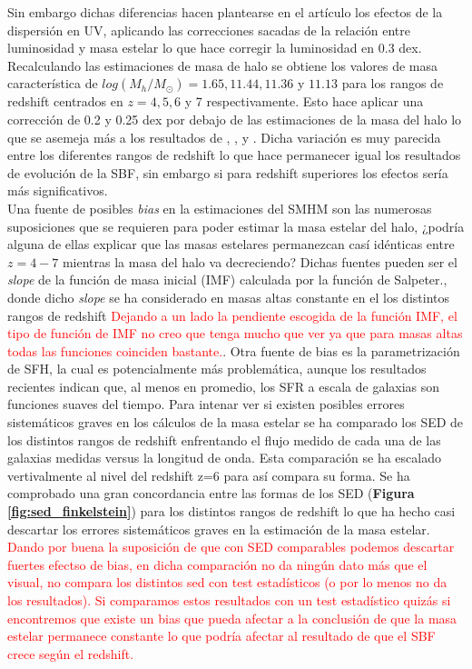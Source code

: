 Sin embargo dichas diferencias hacen plantearse en el artículo los efectos de la dispersión en UV, aplicando las correcciones sacadas de la relación entre luminosidad y masa estelar lo que hace corregir la luminosidad en 0.3 dex. Recalculando las estimaciones de masa de halo se obtiene los valores de masa característica de $log(M_h/M_\odot)=1.65, 11.44, 11.36$ y $11.13$ para los rangos de redshift centrados en $z=4,5,6$ y 7 respectivamente. Esto hace aplicar una corrección de 0.2 y 0.25 dex por debajo de las estimaciones de la masa del halo lo que se asemeja más a los resultados de \cite{behroozi2013average}, \cite{barone2014measurement}, \cite{lee2006large} y \cite{overzier2006clustering}. Dicha variación es muy parecida entre los diferentes rangos de redshift lo que hace permanecer igual los resultados de evolución de la SBF, sin embargo si para redshift superiores los efectos sería más significativos.\\

Una fuente de posibles \textit{bias} en la estimaciones del SMHM son las numerosas suposiciones que se requieren para poder estimar la masa estelar del halo, ¿podría alguna de ellas explicar que las masas estelares permanezcan casí idénticas entre $z=4-7$ mientras la masa del halo va decreciendo? Dichas fuentes pueden ser el \textit{slope} de la función de masa inicial (IMF) calculada por la función de Salpeter., donde dicho \textit{slope} se ha considerado en masas altas constante en el los distintos rangos de redshift \textcolor{red}{Dejando a un lado la pendiente escogida de la función IMF, el tipo de función de IMF no creo que tenga mucho que ver ya que para masas altas todas las funciones coinciden bastante.}. Otra fuente de bias es la parametrización de SFH, la cual es potencialmente más problemática, aunque los resultados recientes indican que, al menos en promedio, los SFR a escala de galaxias son funciones suaves del tiempo. Para intenar ver si existen posibles errores sistemáticos graves en los cálculos de la masa estelar se ha comparado  los SED de los distintos rangos de redshift enfrentando el flujo medido de cada una de las galaxias medidas versus la longitud de onda. Esta comparación se ha escalado vertivalmente al nivel del redshift z=6 para así compara su forma. Se ha comprobado una gran concordancia entre las formas de los SED (\textbf{Figura \ref{fig:sed_finkelstein}}) para los distintos rangos de redshift lo que ha hecho casi descartar los errores sistemáticos graves en la estimación de la masa estelar. \textcolor{red}{Dando por buena la suposición de que con SED comparables podemos descartar fuertes efectso de bias, en dicha comparación no da ningún dato más que el visual, no compara los distintos sed con test estadísticos (o por lo menos no da los resultados). Si comparamos estos resultados con un test estadístico quizás si encontremos que existe un bias que pueda afectar a la conclusión de que la masa estelar permanece constante lo que podría afectar al resultado de que el SBF crece según el redshift.}\\

